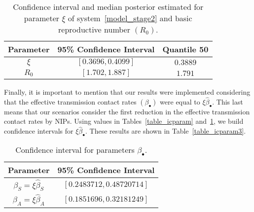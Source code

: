 \begin{table}[h!]
\begin{center}
	\begin{tabular}{ccc}
		\toprule
	    Parameter & 95\% Confidence Interval & Quantile 50
			\\
			\midrule
            $\xi$     & $[0.3696, 0.4099]$  & $0.3889$  \\
            $R_0$ & $[1.702, 1.887]$ &  $1.791$ \\
			\bottomrule
	\end{tabular}
  \caption{Confidence interval and median posterior estimated for
  parameter $\xi$ of system~\eqref{model_stage2} and basic reproductive
  number $(R_0)$.}\label{table_icparam2}
\end{center}
\end{table}

Finally, it is important to mention that our results were implemented
considering that the effective transmission contact rates
$(\beta_{\bullet})$ were equal to $\xi\hat{\beta}_{\bullet}$. This last
means that our scenarios consider the first reduction in the effective
transmission contact rates by NIPs. Using values in
Tables~\ref{table_icparam} and~\ref{table_icparam2}, we build confidence
intervals for $\xi\hat{\beta}_{\bullet}$. These results are shown in
Table~\eqref{table_icparam3}.
\begin{table}[h!]
\begin{center}
	\begin{tabular}{cc}
		\toprule
	    Parameter & 95\% Confidence Interval
			\\
			\midrule
            $\beta_S = \xi\hat{\beta}_S$ & $[0.2483712, 0.48720714]$ \\
            $\beta_A = \xi\hat{\beta}_A$ & $[0.1851696, 0.32181249]$ \\
			\bottomrule
	\end{tabular}
  \caption{Confidence interval for parameters
  $\beta_{\bullet}$.}\label{table_icparam3}
\end{center}
\end{table}




